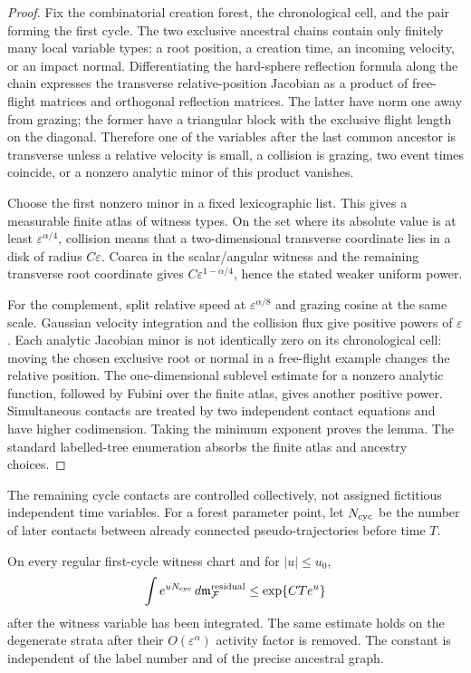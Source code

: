 \begin{proof}
Fix the combinatorial creation forest, the chronological cell, and the pair
forming the first cycle.  The two exclusive ancestral chains contain only
finitely many local variable types: a root position, a creation time, an
incoming velocity, or an impact normal.  Differentiating the hard-sphere
reflection formula along the chain expresses the transverse relative-position
Jacobian as a product of free-flight matrices and orthogonal reflection
matrices.  The latter have norm one away from grazing; the former have a
triangular block with the exclusive flight length on the diagonal.  Therefore
one of the variables after the last common ancestor is transverse unless a
relative velocity is small, a collision is grazing, two event times coincide,
or a nonzero analytic minor of this product vanishes.

Choose the first nonzero minor in a fixed lexicographic list.  This gives a
measurable finite atlas of witness types.  On the set where its absolute value
is at least \(\varepsilon^{\alpha/4}\), collision means that a two-dimensional
transverse coordinate lies in a disk of radius \(C\varepsilon\).  Coarea in
the scalar/angular witness and the remaining transverse root coordinate gives
\(C\varepsilon^{1-\alpha/4}\), hence the stated weaker uniform power.

For the complement, split relative speed at \(\varepsilon^{\alpha/8}\) and
grazing cosine at the same scale.  Gaussian velocity integration and the
collision flux give positive powers of \(\varepsilon\).  Each analytic
Jacobian minor is not identically zero on its chronological cell: moving the
chosen exclusive root or normal in a free-flight example changes the relative
position.  The one-dimensional sublevel estimate for a nonzero analytic
function, followed by Fubini over the finite atlas, gives another positive
power.  Simultaneous contacts are treated by two independent contact equations
and have higher codimension.  Taking the minimum exponent proves the lemma.
The standard labelled-tree enumeration absorbs the finite atlas and ancestry
choices.
\end{proof}

The remaining cycle contacts are controlled collectively, not assigned
fictitious independent time variables.  For a forest parameter point, let
\(N_{\rm cyc}\) be the number of later contacts between already connected
pseudo-trajectories before time \(T\).

\begin{lemma}
\label{lem:r4-b2-contact-ledger}
On every regular first-cycle witness chart and for \(|u|\le u_0\),
\[
 \int e^{uN_{\rm cyc}}
 \,d\mathfrak m_{\mathcal F}^{\rm residual}
 \le \exp\{C T e^{u}\}
\]
after the witness variable has been integrated.  The same estimate holds on
the degenerate strata after their \(O(\varepsilon^\alpha)\) activity factor is
removed.  The constant is independent of the label number and of the precise
ancestral graph.
\end{lemma}

